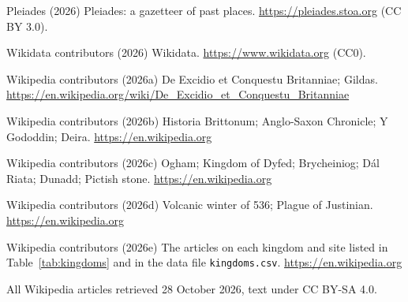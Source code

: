 \documentclass[11pt,a4paper]{article}
\begin{document}
Pleiades (2026) Pleiades: a gazetteer of past places. \url{https://pleiades.stoa.org} (CC BY 3.0).

Wikidata contributors (2026) Wikidata. \url{https://www.wikidata.org} (CC0).

Wikipedia contributors (2026a) De Excidio et Conquestu Britanniae; Gildas. \url{https://en.wikipedia.org/wiki/De_Excidio_et_Conquestu_Britanniae}

Wikipedia contributors (2026b) Historia Brittonum; Anglo-Saxon Chronicle; Y Gododdin; Deira. \url{https://en.wikipedia.org}

Wikipedia contributors (2026c) Ogham; Kingdom of Dyfed; Brycheiniog; Dál Riata; Dunadd; Pictish stone. \url{https://en.wikipedia.org}

Wikipedia contributors (2026d) Volcanic winter of 536; Plague of Justinian. \url{https://en.wikipedia.org}

Wikipedia contributors (2026e) The articles on each kingdom and site listed in Table~\ref{tab:kingdoms} and in the data file \texttt{kingdoms.csv}. \url{https://en.wikipedia.org}

All Wikipedia articles retrieved 28 October 2026, text under CC BY-SA 4.0.
\end{document}
